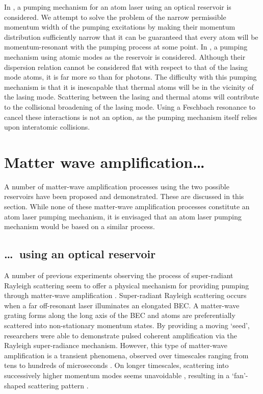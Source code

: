 In , a pumping mechanism for an atom laser using an optical reservoir is considered.  We attempt to solve the problem of the narrow permissible momentum width of the pumping excitations by making their momentum distribution sufficiently narrow that it can be guaranteed that every atom will be momentum-resonant with the pumping process at some point.  In , a pumping mechanism using atomic modes as the reservoir is considered.  Although their dispersion relation cannot be considered flat with respect to that of the lasing mode atoms, it is far more so than for photons.  The difficulty with this pumping mechanism is that it is inescapable that thermal atoms will be in the vicinity of the lasing mode.  Scattering between the lasing and thermal atoms will contribute to the collisional broadening of the lasing mode.  Using a Feschbach resonance to cancel these interactions is not an option, as the pumping mechanism itself relies upon interatomic collisions.

\section{Matter wave amplification\dots}

A number of matter-wave amplification processes using the two possible reservoirs have been proposed and demonstrated.  These are discussed in this section.  While none of these matter-wave amplification processes constitute an atom laser pumping mechanism, it is envisaged that an atom laser pumping mechanism would be based on a similar process.

\subsection{\dots\ using an optical reservoir}

A number of previous experiments observing the process of super-radiant Rayleigh scattering seem to offer a physical mechanism for providing pumping through matter-wave amplification \citep{Inouye:1999ph,Kozuma:1999pi}.  Super-radiant Rayleigh scattering occurs when a far off-resonant laser illuminates an elongated BEC.  A matter-wave grating forms along the long axis of the BEC and atoms are preferentially scattered into non-stationary momentum states.  By providing a moving `seed', researchers were able to demonstrate pulsed coherent amplification via the Rayleigh super-radiance mechanism.  However, this type of matter-wave amplification is a transient phenomena, observed over timescales ranging from tens \citep{Inouye:1999ph} to hundreds of microseconds \citep{Kozuma:1999pi}.  On longer timescales, scattering into successively higher momentum modes seems unavoidable \citep{Zobay:2006}, resulting in a `fan'-shaped scattering pattern \citep{Inouye:1999yq}.

